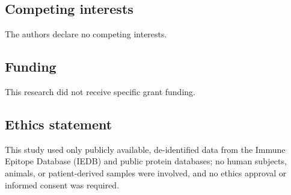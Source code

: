 \documentclass[10pt]{article}
\begin{document}
\subsection{Competing interests}\label{competing-interests}

The authors declare no competing interests.

\subsection{Funding}\label{funding}

This research did not receive specific grant funding.

\subsection{Ethics statement}\label{ethics-statement}

This study used only publicly available, de-identified data from the
Immune Epitope Database (IEDB) and public protein databases; no human
subjects, animals, or patient-derived samples were involved, and no
ethics approval or informed consent was required.



\end{document}
